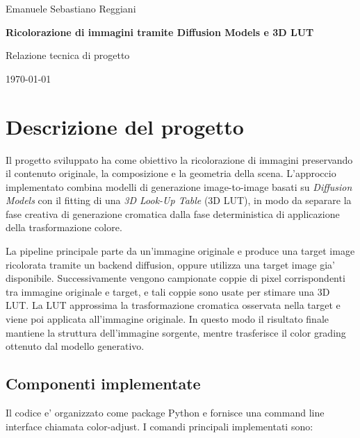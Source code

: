 \documentclass[12pt,a4paper]{report}
\renewcommand{\texttt}[1]{{\normalfont #1}}
\begin{document}
\begin{titlepage}
    \centering
    \vspace*{2cm}

    {\Large Emanuele Sebastiano Reggiani\par}
    \vspace{2cm}

    {\Huge\bfseries Ricolorazione di immagini tramite Diffusion Models e 3D LUT\par}
    \vspace{1.5cm}

    {\large Relazione tecnica di progetto\par}
    \vfill

    {\large \today\par}
\end{titlepage}

\tableofcontents
\clearpage

\chapter{Descrizione del progetto}

Il progetto sviluppato ha come obiettivo la ricolorazione di immagini preservando il contenuto originale, la composizione e la geometria della scena. L'approccio implementato combina modelli di generazione image-to-image basati su \textit{Diffusion Models} con il fitting di una \textit{3D Look-Up Table} (3D LUT), in modo da separare la fase creativa di generazione cromatica dalla fase deterministica di applicazione della trasformazione colore.

La pipeline principale parte da un'immagine originale e produce una target image ricolorata tramite un backend diffusion, oppure utilizza una target image gia' disponibile. Successivamente vengono campionate coppie di pixel corrispondenti tra immagine originale e target, e tali coppie sono usate per stimare una 3D LUT. La LUT approssima la trasformazione cromatica osservata nella target e viene poi applicata all'immagine originale. In questo modo il risultato finale mantiene la struttura dell'immagine sorgente, mentre trasferisce il color grading ottenuto dal modello generativo.

\section{Componenti implementate}

Il codice e' organizzato come package Python e fornisce una command line interface chiamata \texttt{color-adjust}. I comandi principali implementati sono:
\end{document}

